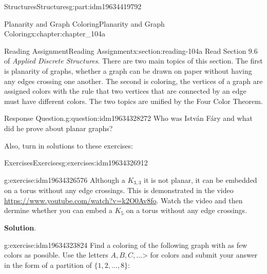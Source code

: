 \documentclass[oneside,10pt,]{book}
\newcommand{\blocktitlefont}{\relax}
\numberwithin{equation}{section}
\begin{document}
\begin{partptx}{Structures}{}{Structures}{}{}{g:part:idm19634419792}
\typeout{************************************************}
%
\begin{chapterptx}{Planarity and Graph Coloring}{}{Planarity and Graph Coloring}{}{}{x:chapter:chapter_104a}
%
%
%
%
%
\typeout{************************************************}
\typeout{************************************************}
%
\begin{sectionptx}{Reading Assignment}{}{Reading Assignment}{}{}{x:section:reading-104a}
Read Section 9.6 of \emph{Applied Discrete Structures}. There are two main topics of this section. The first is planarity of graphs, whether a graph can be drawn on paper without having any edges crossing one another.  The second is coloring, the vertices of a graph are assigned colors with the rule that two vertices that are connected by an edge must have different colors.  The two topics are unified by the Four Color Theorem.%
\begin{question}{Response Question.}{g:question:idm19634328272}%
Who was István Fáry and what did he prove about planar graphs?%
\end{question}
Also, turn in solutions to these exercises:%
%
%
\typeout{************************************************}
\typeout{************************************************}
%
\begin{exercises-subsection-numberless}{Exercises}{}{Exercises}{}{}{g:exercises:idm19634326912}
\par\medskip\noindent%
%
\begin{exercisegroup}
\begin{divisionexerciseeg}{1}{}{}{g:exercise:idm19634326576}%
Although a \(K_{3,3}\) it is not planar, it can be embedded on a torus without any edge crossings.  This is demonstrated in the video \href{}{https:\slash{}\slash{}www.youtube.com\slash{}watch?v=k2O0Av\textunderscore{}8\textunderscore{}fo}.  Watch the video and then dermine whether you can embed a \(K_5\) on a torus without any edge crossings.%
\par\smallskip%
\noindent\textbf{\blocktitlefont Solution}.\hypertarget{g:solution:idm19634326448}{}\quad{}\textunderscore{}%
\end{divisionexerciseeg}%
\begin{divisionexerciseeg}{2}{}{}{g:exercise:idm19634323824}%
Find a coloring of the following graph with as few colors as possible.  Use the letters \(A,B,C,  \dots\)\textgreater{} for colors and submit your answer in the form of a partition of \(\{1,2,\dots, 8\}\):%

\end{divisionexerciseeg}
\end{exercisegroup}
\end{exercises-subsection-numberless}
\end{sectionptx}
\end{chapterptx}
\end{partptx}
\end{document}
